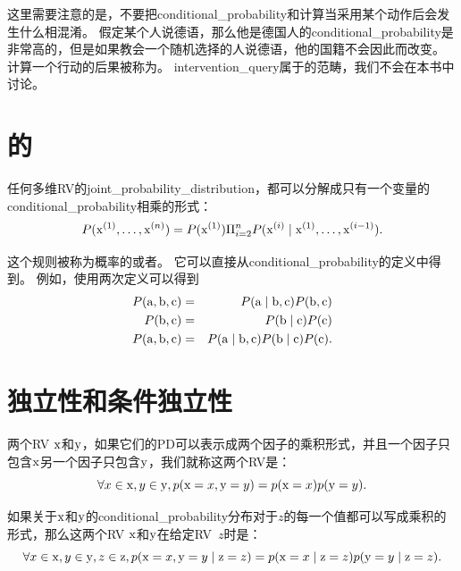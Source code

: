 这里需要注意的是，不要把\gls{conditional_probability}和计算当采用某个动作后会发生什么相混淆。
假定某个人说德语，那么他是德国人的\gls{conditional_probability}是非常高的，但是如果教会一个随机选择的人说德语，他的国籍不会因此而改变。
计算一个行动的后果被称为。
\gls{intervention_query}属于的范畴，我们不会在本书中讨论。

\section{的}
\label{sec:the_chain_rule_of_conditional_probabilities}

任何多维\gls{RV}的\gls{joint_probability_distribution}，都可以分解成只有一个变量的\gls{conditional_probability}相乘的形式：
\begin{equation}
P(\mathrm{x}^{(1)}, \ldots, \mathrm{x}^{(n)}) = P(\mathrm{x}^{(1)}) \Pi_{i=2}^n P(\mathrm{x}^{(i)} \mid \mathrm{x}^{(1)}, \ldots, \mathrm{x}^{(i-1)}) .
\label{eq:chap3_chain_rule}
\end{equation}


这个规则被称为概率的或者。
它可以直接从\gls{conditional_probability}的定义中得到。
例如，使用两次定义可以得到
\begin{eqnarray*}
P(\mathrm{a}, \mathrm{b}, \mathrm{c}) &=& P(\mathrm{a} \mid \mathrm{b}, \mathrm{c}) P(\mathrm{b}, \mathrm{c})\\
P(\mathrm{b}, \mathrm{c}) &=& P(\mathrm{b} \mid \mathrm{c}) P(\mathrm{c})\\
P(\mathrm{a}, \mathrm{b}, \mathrm{c}) &=& P(\mathrm{a} \mid \mathrm{b}, \mathrm{c}) P(\mathrm{b} \mid \mathrm{c}) P(\mathrm{c}).
\end{eqnarray*}

\section{独立性和条件独立性}
\label{sec:independence_and_conditional_independence}

两个\gls{RV} $\mathrm{x}$和$\mathrm{y}$，如果它们的\gls{PD}可以表示成两个因子的乘积形式，并且一个因子只包含$\mathrm{x}$另一个因子只包含$\mathrm{y}$，我们就称这两个\gls{RV}是：
\begin{equation}
\forall x \in \mathrm{x}, y \in \mathrm{y}, p(\mathrm{x} = x, \mathrm{y} = y) = p(\mathrm{x} = x)p(\mathrm{y} = y).
\end{equation}

如果关于$\mathrm{x}$和$\mathrm{y}$的\gls{conditional_probability}分布对于$z$的每一个值都可以写成乘积的形式，那么这两个\gls{RV} $\mathrm{x}$和$\mathrm{y}$在给定\gls{RV}~$z$时是：
\begin{equation}
\forall x \in \mathrm{x}, y \in \mathrm{y}, z \in \mathrm{z}, p( \mathrm{x}=x, \mathrm{y}=y \mid \mathrm{z}=z) =
p(\mathrm{x} = x \mid \mathrm{z} = z) p(\mathrm{y} = y \mid \mathrm{z} = z).
\end{equation}


